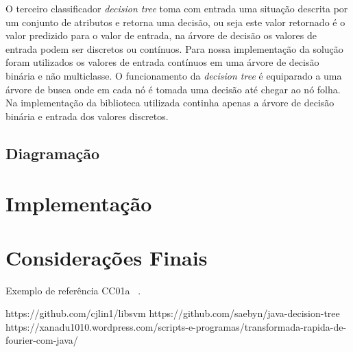 \documentclass[12pt]{article}
\begin{document}
	O terceiro classificador \textit{decision tree} toma com entrada uma situação descrita por um conjunto de atributos e retorna uma decisão, ou seja este valor retornado é o valor predizido para o valor de entrada, na árvore de decisão os valores de entrada podem ser discretos ou contínuos. Para nossa implementação da solução foram utilizados os valores de entrada contínuos em uma árvore de decisão binária e não multiclasse. O funcionamento da \textit{decision tree} é equiparado a uma árvore de busca onde em cada nó é tomada uma decisão até chegar ao nó folha. Na implementação da biblioteca utilizada continha apenas a árvore de decisão binária e entrada dos valores discretos.





\subsection{Diagramação}\label{sec:diagramacao}
	
	




\section{Implementação}



\section{Considerações Finais}


Exemplo de referência CC01a ~\cite{CC01}.

https://github.com/cjlin1/libsvm
https://github.com/saebyn/java-decision-tree
https://xanadu1010.wordpress.com/scripts-e-programas/transformada-rapida-de-fourier-com-java/

{}

\end{document}
